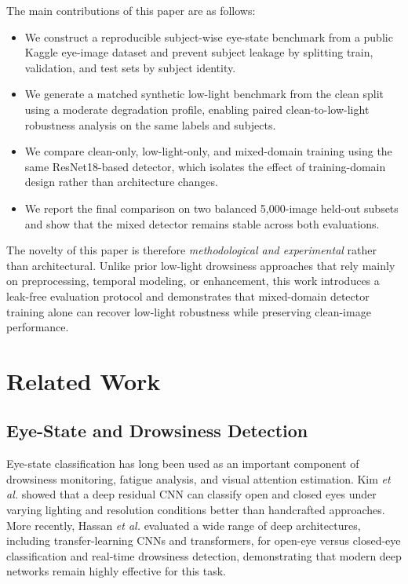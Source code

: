 \documentclass[conference]{IEEEtran}
\begin{document}
The main contributions of this paper are as follows:

\begin{itemize}
\item We construct a reproducible subject-wise eye-state benchmark from a public Kaggle eye-image dataset and prevent subject leakage by splitting train, validation, and test sets by subject identity.
\item We generate a matched synthetic low-light benchmark from the clean split using a moderate degradation profile, enabling paired clean-to-low-light robustness analysis on the same labels and subjects.
\item We compare clean-only, low-light-only, and mixed-domain training using the same ResNet18-based detector, which isolates the effect of training-domain design rather than architecture changes.
\item We report the final comparison on two balanced 5,000-image held-out subsets and show that the mixed detector remains stable across both evaluations.
\end{itemize}

The novelty of this paper is therefore \emph{methodological and experimental} rather than architectural. Unlike prior low-light drowsiness approaches that rely mainly on preprocessing, temporal modeling, or enhancement, this work introduces a leak-free evaluation protocol and demonstrates that mixed-domain detector training alone can recover low-light robustness while preserving clean-image performance.

\section{Related Work}

\subsection{Eye-State and Drowsiness Detection}

Eye-state classification has long been used as an important component of drowsiness monitoring, fatigue analysis, and visual attention estimation. Kim \emph{et al.} \cite{kim2017} showed that a deep residual CNN can classify open and closed eyes under varying lighting and resolution conditions better than handcrafted approaches. More recently, Hassan \emph{et al.} \cite{hassan2025} evaluated a wide range of deep architectures, including transfer-learning CNNs and transformers, for open-eye versus closed-eye classification and real-time drowsiness detection, demonstrating that modern deep networks remain highly effective for this task.
\end{document}
